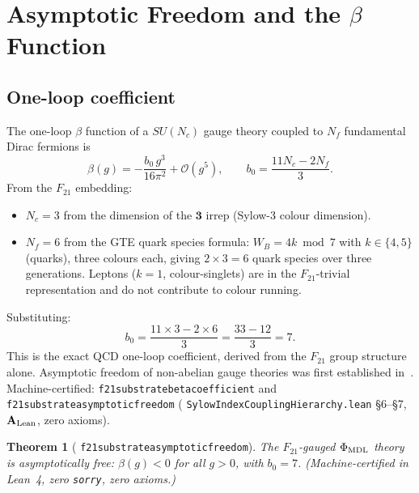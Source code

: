 \documentclass[11pt]{article}
\newtheorem{theorem}{Theorem}[section]
\theoremstyle{remark}
\newcommand{\phimdl}{\Phi_{\rm MDL}}
\newcommand{\Ftwentyone}{F_{21}}
\newcommand{\lean}[1]{%
  \penalty-100
  \begingroup\def\_{\textunderscore\allowbreak}\texttt{#1}\endgroup}
\newcommand{\CatAL}{\ensuremath{\textbf{A}_{\rm Lean}}}
\begin{document}
\section{Asymptotic Freedom and the \texorpdfstring{$\beta$}{beta} Function}
\label{sec:asymp}

\subsection{One-loop coefficient}
\label{ssec:oneloop}

The one-loop $\beta$ function of a $SU(N_c)$ gauge theory coupled to $N_f$
fundamental Dirac fermions is
\begin{equation}
  \beta(g) = -\frac{b_0\,g^3}{16\pi^2} + \mathcal{O}(g^5),
  \qquad
  b_0 = \frac{11 N_c - 2 N_f}{3}.
  \label{eq:betaoneloop}
\end{equation}
From the $\Ftwentyone$ embedding:
\begin{itemize}[leftmargin=2em]
\item $N_c = 3$ from the dimension of the $\mathbf{3}$ irrep (Sylow-3 colour
  dimension).
\item $N_f = 6$ from the GTE quark species formula: $W_B = 4k \bmod 7$ with
  $k \in \{4,5\}$ (quarks), three colours each, giving $2 \times 3 = 6$ quark
  species over three generations.
  Leptons ($k=1$, colour-singlets) are in the $\Ftwentyone$-trivial
  representation and do not contribute to colour running.
\end{itemize}
Substituting:
\begin{equation}
  b_0 = \frac{11 \times 3 - 2 \times 6}{3} = \frac{33 - 12}{3} = 7.
  \label{eq:b0}
\end{equation}
This is the exact QCD one-loop coefficient, derived from the $\Ftwentyone$
group structure alone.
Asymptotic freedom of non-abelian gauge theories was first established
in~\cite{GrossWilczek1973,Politzer1973}.
Machine-certified: \lean{f21\_substrate\_beta\_coefficient} and
\lean{f21\_substrate\_asymptotic\_freedom}
(\lean{SylowIndexCouplingHierarchy.lean} §6--§7, \CatAL{}, zero axioms).

\begin{theorem}[\lean{f21\_substrate\_asymptotic\_freedom}]
The $\Ftwentyone$-gauged $\phimdl$ theory is asymptotically free:
$\beta(g) < 0$ for all $g > 0$, with $b_0 = 7$.
(Machine-certified in Lean~4, zero \texttt{sorry}, zero axioms.)
\end{theorem}
\end{document}
